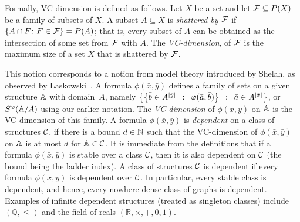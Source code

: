 Formally, VC-dimension is defined as follows. 
Let $X$ be a set and let  $\FFF\subseteq P(X)$ 
be a family of subsets of $X$.
A subset $A\subseteq X$ is \emph{shattered by $\FFF$} if
$\{A\cap F\colon F\in \FFF\}=P(A)$; that is, every subset of $A$ can be obtained as the intersection of some set from $\FFF$ with $A$. 
The \emph{VC-dimension},
of $\FFF$ is the maximum size of a set $X$ that is shattered by
$\FFF$.

This notion corresponds to a notion from model theory  introduced by Shelah, as  observed  by Laskowski~\cite{laskowski1992vapnik}.
A formula $\phi(\bar x,\bar y)$
defines a family of sets on a given structure $\str A$ with domain~$A$, namely $\setof{
\setof{\bar b\in A^{|\bar y|}}
{\phi(\bar a,\bar b)}}
{\bar a\in A^{|\bar x|}}$,
or $S^\phi(\str A/A)$ using our earlier notation. The \emph{VC-dimension} of $\phi(\bar x,\bar y)$ on $\str A$ is the VC-dimension of this family. A formula $\phi(\bar x,\bar y)$ is \emph{dependent}
on a class of structures $\cal C$,
if there is a bound $d\in\N$ such that the VC-dimension of $\phi(\bar x,\bar y)$ on $\str A$ is at most $d$ for $\str A\in\cal C$. It is immediate from the definitions  that if a formula $\phi(\bar x,\bar y)$ is stable over a  class $\cal C$, then it is also dependent on $\cal C$ (the bound being the ladder index). 
A class of structures  $\cal C$ is dependent if every formula $\phi(\bar x,\bar y)$ is dependent over $\cal C$. In particular, every stable class is dependent, and hence, every nowhere dense class of graphs is dependent.
Examples of infinite dependent structures (treated as singleton classes) include 
$(\mathbb Q,\le )$ and the field of reals $(\mathbb R,\times,+,0,1)$. 



%
%
%
%

